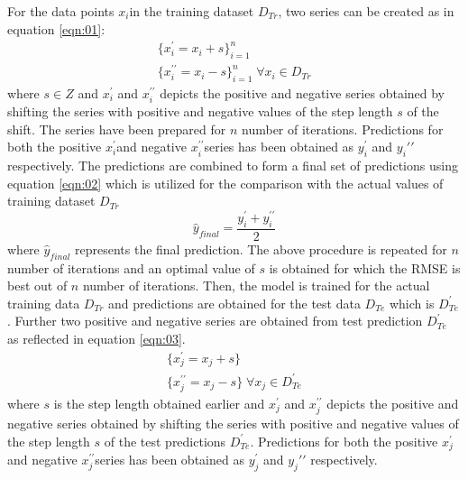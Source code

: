 \documentclass[sn-mathphys,Numbered]{sn-jnl}
\theoremstyle{thmstyleone}
\theoremstyle{thmstyletwo}
\theoremstyle{thmstylethree}
\begin{document}
For the data points $x_i$in the training dataset $D_{Tr}$, two series can be created as in equation \ref{eqn:01}:
\begin{equation}
\begin{aligned}
\label{eqn:01}
\{x_i^{\prime}=x_i+s\}_{i=1}^n \\
\{x_i^{\prime\prime}=x_i-s\}_{i=1}^n \; \forall x_i \in D_{Tr}
\end{aligned}
\end{equation}
where $s \in Z$ and $x_i^{\prime}$ and $x_{i}^{\prime\prime}$ depicts the positive and negative series obtained by shifting the series with positive and negative values of the step length $s$ of the shift. The series have been prepared for $n$ number of iterations.
Predictions for both the positive $x_i^{\prime}$and negative $x_i^{\prime\prime}$series has been obtained as $y_i^{\prime}$ and $y_i{\prime\prime}$ respectively.
The predictions are combined to form a final set of predictions using equation \ref{eqn:02} which is utilized for the comparison with the actual values of training dataset $D_{Tr}$
\begin{equation}
\label{eqn:02}
\hat{y}_{final}=\frac{y_i^{\prime}+y_i^{\prime\prime}}{2}
\end{equation}
where $\hat{y}_{final}$ represents the final prediction. The above procedure is repeated for $n$ number of iterations and an optimal value of $s$ is obtained for which the RMSE is best out of $n$ number of iterations. 
Then, the model is trained for the actual training data $D_{Tr}$ and predictions are obtained for the test data $D_{Te}$ which is $D_{Te}^{\prime}$. Further two positive and negative series are obtained from test prediction $D_{Te}^{\prime}$ as reflected in equation \ref{eqn:03}.
\begin{equation}
\begin{aligned}
\label{eqn:03}
\{x_j^{\prime}=x_j+s\} \\
\{x_j^{\prime\prime}=x_j-s\} \; \forall x_j \in D_{Te}^{\prime}
\end{aligned}
\end{equation}
where $s$ is the step length obtained earlier and $x_j^{\prime}$ and $x_{j}^{\prime\prime}$ depicts the positive and negative series obtained by shifting the series with positive and negative values of the step length $s$ of the test predictions $ D_{Te}^{\prime}$.
Predictions for both the positive $x_j^{\prime}$and negative $x_j^{\prime\prime}$series has been obtained as $y_j^{\prime}$ and $y_j{\prime\prime}$ respectively.
\end{document}
